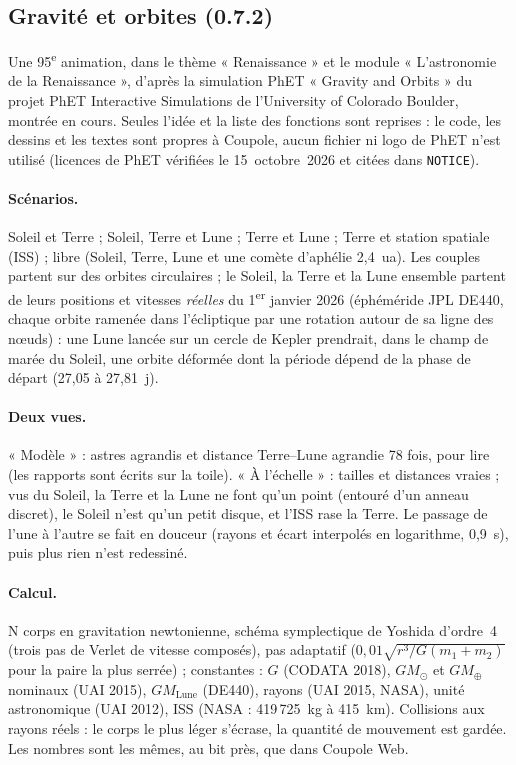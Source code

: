\subsection{Gravité et orbites (0.7.2)}\label{sec:gravite}
Une 95\textsuperscript{e} animation, dans le thème « Renaissance » et le module « L'astronomie de la Renaissance »,
d'après la simulation PhET « Gravity and Orbits » du projet PhET Interactive Simulations de l'University of Colorado
Boulder, montrée en cours. Seules l'idée et la liste des fonctions sont reprises : le code, les dessins et les textes
sont propres à Coupole, aucun fichier ni logo de PhET n'est utilisé (licences de PhET vérifiées le 15~octobre~2026 et
citées dans \texttt{NOTICE}).

\paragraph{Scénarios.} Soleil et Terre ; Soleil, Terre et Lune ; Terre et Lune ; Terre et station spatiale (ISS) ;
libre (Soleil, Terre, Lune et une comète d'aphélie 2,4~ua). Les couples partent sur des orbites circulaires ; le
Soleil, la Terre et la Lune ensemble partent de leurs positions et vitesses \emph{réelles} du 1\textsuperscript{er}
janvier 2026 (éphéméride JPL DE440, chaque orbite ramenée dans l'écliptique par une rotation autour de sa ligne des
nœuds) : une Lune lancée sur un cercle de Kepler prendrait, dans le champ de marée du Soleil, une orbite déformée dont
la période dépend de la phase de départ (27,05 à 27,81~j).

\paragraph{Deux vues.} « Modèle » : astres agrandis et distance Terre--Lune agrandie 78 fois, pour lire (les rapports
sont écrits sur la toile). « À l'échelle » : tailles et distances vraies ; vus du Soleil, la Terre et la Lune ne font
qu'un point (entouré d'un anneau discret), le Soleil n'est qu'un petit disque, et l'ISS rase la Terre. Le passage de
l'une à l'autre se fait en douceur (rayons et écart interpolés en logarithme, 0,9~s), puis plus rien n'est redessiné.

\paragraph{Calcul.} N corps en gravitation newtonienne, schéma symplectique de Yoshida d'ordre~4 (trois pas de Verlet
de vitesse composés), pas adaptatif ($0{,}01\sqrt{r^3/G(m_1+m_2)}$ pour la paire la plus serrée) ; constantes : $G$
(CODATA 2018), $GM_\odot$ et $GM_\oplus$ nominaux (UAI 2015), $GM_{\mathrm{Lune}}$ (DE440), rayons (UAI 2015, NASA), unité
astronomique (UAI 2012), ISS (NASA : 419\,725~kg à 415~km). Collisions aux rayons réels : le corps le plus léger
s'écrase, la quantité de mouvement est gardée. Les nombres sont les mêmes, au bit près, que dans Coupole Web.

